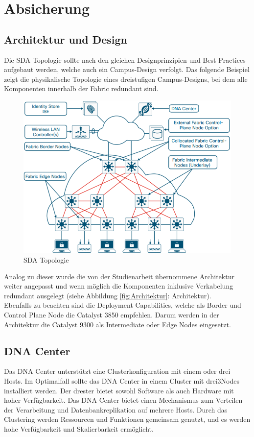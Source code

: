 \section{Absicherung}

\subsection{Architektur und Design}
Die SDA Topologie sollte nach den gleichen Designprinzipien und Best Practices aufgebaut werden, welche auch ein Campus-Design verfolgt. Das folgende Beispiel zeigt die physikalische Topologie eines dreistufigen Campus-Designs, bei dem alle Komponenten innerhalb der Fabric redundant sind.

\begin{figure}[H]
	\centering
	\includegraphics[width=0.8\linewidth]{img/Absicherung/SDA-Architektur}
	\caption{SDA Topologie \cite{sda-designguide-sept2018} }
	\label{fig:SDA Topologie}
\end{figure}

Analog zu dieser wurde die von der Studienarbeit übernommene Architektur weiter angepasst und wenn möglich die Komponenten inklusive Verkabelung redundant ausgelegt (siehe Abbildung \ref{fig:Architektur}: Architektur). \\

Ebenfalls zu beachten sind die Deployment Capabilities, welche als Border und Control Plane Node die Catalyst 3850 empfehlen. Darum werden in der Architektur die Catalyst 9300 als Intermediate oder Edge Nodes eingesetzt.

\subsection{DNA Center}
Das DNA Center unterstützt eine Clusterkonfiguration mit einem oder drei Hosts. Im Optimalfall sollte das DNA Center in einem Cluster mit drei3Nodes installiert werden. Der drester bietet sowohl Software als auch Hardware mit hoher Verfügbarkeit. Das DNA Center bietet einen Mechanismus zum Verteilen der Verarbeitung und Datenbankreplikation auf mehrere Hosts. Durch das Clustering werden Ressourcen und Funktionen gemeinsam genutzt, und es werden hohe Verfügbarkeit und Skalierbarkeit ermöglicht. \\


